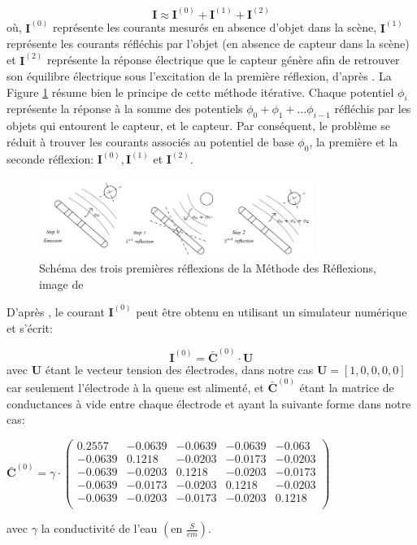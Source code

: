\begin{equation}
    \mathbf{I} \approx \mathbf{I}^{(0)} + \mathbf{I}^{(1)} + \mathbf{I}^{(2)}
\end{equation}
où, $\mathbf{I}^{(0)}$ représente les courants mesurés en absence d'objet dans la scène, $\mathbf{I}^{(1)}$ représente les courants réfléchis par l'objet (en absence de capteur dans la scène) et  $\mathbf{I}^{(2)}$ représente la réponse électrique que le capteur génère afin de retrouver son équilibre électrique sous l'excitation de la première réflexion, d'après \cite{Boyer2013}. La Figure \ref{fig:reflexions} résume bien le principe de cette méthode itérative. Chaque potentiel $\phi_i$ représente la réponse à la somme des potentiels $\phi_0 + \phi_1 + \dots \phi_{i-1}$ réfléchis par les objets qui entourent le capteur, et le capteur. Par conséquent, le problème se réduit à trouver les courants associés au potentiel de base $\phi_0$, la première et la seconde réflexion: $\mathbf{I}^{(0)}, \mathbf{I}^{(1)}$ et $\mathbf{I}^{(2)}$. 
\clearpage 
\begin{figure}[h!]
    \centering
    \includegraphics[width=0.8\textwidth]{doc/img/reflexions.png}
    \caption{Schéma des trois premières réflexions de la Méthode des Réflexions, image de \cite{Boyer2012}}
    \label{fig:reflexions}
\end{figure}

D'après \cite{BENACHENHOU}, le courant $\mathbf{I}^{(0)}$ peut être obtenu en utilisant un simulateur numérique et s'écrit: 

\begin{equation}
    \mathbf{I}^{(0)} = \bar{\mathbf{C}}^{(0)} \cdot \mathbf{U}
\end{equation}
avec $\mathbf{U}$ étant le vecteur tension des électrodes, dans notre cas $\mathbf{U} = \left [1, 0, 0, 0, 0 \right ]$ car seulement l'électrode à la queue est alimenté, et $\bar{\mathbf{C}}^{(0)}$ étant la matrice de conductances à vide entre chaque électrode et ayant la suivante forme dans notre cas: 
\begin{center}
$\bar{\mathbf{C}}^{(0)} = \gamma \cdot 
\begin{pmatrix}
0.2557 & -0.0639 & -0.0639 & -0.0639 & -0.063 \\
-0.0639 & 0.1218 & -0.0203 & -0.0173 & -0.0203 \\
-0.0639 & -0.0203 & 0.1218 & -0.0203 & -0.0173 \\
-0.0639 & -0.0173 & -0.0203 & 0.1218 & -0.0203 \\
-0.0639 & -0.0203 & -0.0173 & -0.0203 & 0.1218 \\
\end{pmatrix}$
\end{center}
avec $\gamma$ la conductivité de l'eau $\left ( \text{en } \frac{S}{cm} \right )$.

